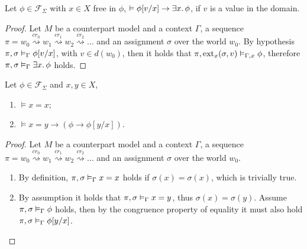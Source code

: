 \begin{lemma}\label{lem:exintro}
  Let $\phi \in \mathcal{F}_\Sigma$ with $x \in X$ free in $\phi$, $\vDash \phi[v/x] \to \exists {x} \ldotp {\phi}$, if $v$ is a
  value in the domain.
\end{lemma}
\begin{proof}
  Let $M$ be a counterpart model and a context $\Gamma$, a sequence $\pi = w_0 \overset{cr_0}{\rightsquigarrow} w_1
  \overset{cr_1}{\rightsquigarrow} w_2 \overset{cr_2}{\rightsquigarrow} \ldots$ and an assignment $\sigma$ over the
  world $w_0$.
  By hypothesis ${\pi}, {\sigma} \vDash_{\Gamma} {\phi[v/x]}$, with $v \in d(w_0)$, then it holds that
  ${\pi}, {\operatorname{ext}_{x}({\sigma},{v})} \vDash_{\Gamma,x} {\phi}$, therefore ${\pi}, {\sigma} \vDash_{\Gamma} {\exists {x} \ldotp {\phi}}$ holds.
\end{proof}

\begin{lemma}\label{lem:equality}
  Let $\phi \in \mathcal{F}_\Sigma$ and $x, y \in X$,
  \begin{enumerate}
    \item $\vDash x = x$;
    \item $\vDash x = y \to (\phi \to \phi[y/x])$.
  \end{enumerate}
\end{lemma}
\begin{proof}
  Let $M$ be a counterpart model and a context $\Gamma$, a sequence $\pi = w_0 \overset{cr_0}{\rightsquigarrow} w_1
  \overset{cr_1}{\rightsquigarrow} w_2 \overset{cr_2}{\rightsquigarrow} \ldots$ and an assignment $\sigma$ over the
  world $w_0$.
  \begin{enumerate}
    \item By definition, ${\pi}, {\sigma} \vDash_{\Gamma} {x = x}$ holds if $\sigma(x) = \sigma(x)$, which is trivially true.
    \item By assumption it holds that ${\pi}, {\sigma} \vDash_{\Gamma} {x = y}$, thus $\sigma(x) = \sigma(y)$. Assume
      ${\pi}, {\sigma} \vDash_{\Gamma} {\phi}$ holds, then by the congruence property of equality it must also hold
      ${\pi}, {\sigma} \vDash_{\Gamma} {\phi[y/x]}$.
  \end{enumerate}
\end{proof}

